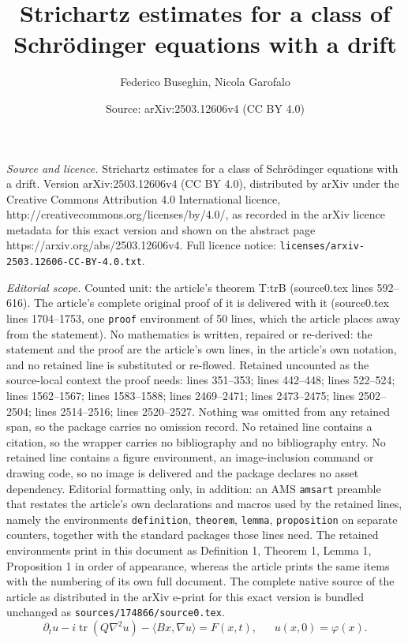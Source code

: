 \documentclass[10pt,a4paper]{amsart}
\title{Strichartz estimates for a class of Schr\"odinger equations with a drift}
\author{Federico Buseghin, Nicola Garofalo}
\date{Source: arXiv:2503.12606v4 (CC BY 4.0)}
\newcommand{\da}{\rangle}
\newcommand{\p}{\partial}
\newcommand{\sa}{\langle}
\newcommand{\tr}{\operatorname{tr}}
\def \vf{\varphi}
\begin{document}
\maketitle

\noindent\emph{Source and licence.} Strichartz estimates for a class of Schr\"odinger equations with a drift. Version arXiv:2503.12606v4 (CC BY 4.0), distributed by arXiv under the Creative Commons Attribution 4.0 International licence, http://creativecommons.org/licenses/by/4.0/, as recorded in the arXiv licence metadata for this exact version and shown on the abstract page https://arxiv.org/abs/2503.12606v4. Full licence notice: \texttt{licenses/arxiv-2503.12606-CC-BY-4.0.txt}.\par\smallskip

\noindent\textit{Editorial scope.} Counted unit: the article's theorem T:trB (source0.tex lines 592--616). The article's complete original proof of it is delivered with it (source0.tex lines 1704--1753, one \texttt{proof} environment of 50 lines, which the article places away from the statement). No mathematics is written, repaired or re-derived: the statement and the proof are the article's own lines, in the article's own notation, and no retained line is substituted or re-flowed.  Retained uncounted as the source-local context the proof needs: lines 351--353; lines 442--448; lines 522--524; lines 1562--1567; lines 1583--1588; lines 2469--2471; lines 2473--2475; lines 2502--2504; lines 2514--2516; lines 2520--2527.  Nothing was omitted from any retained span, so the package carries no omission record.  No retained line contains a citation, so the wrapper carries no bibliography and no bibliography entry.  No retained line contains a figure environment, an image-inclusion command or drawing code, so no image is delivered and the package declares no asset dependency.  Editorial formatting only, in addition: an AMS \texttt{amsart} preamble that restates the article's own declarations and macros used by the retained lines, namely the environments \texttt{definition}, \texttt{theorem}, \texttt{lemma}, \texttt{proposition} on separate counters, together with the standard packages those lines need.  The retained environments print in this document as Definition 1, Theorem 1, Lemma 1, Proposition 1 in order of appearance, whereas the article prints the same items with the numbering of its own full document.  The complete native source of the article as distributed in the arXiv e-print for this exact version is bundled unchanged as \texttt{sources/174866/source0.tex}.
\begin{equation}\label{A}
\p_t u - i \tr(Q\nabla^2 u) -  \sa Bx,\nabla u\da   = F(x,t),\ \ \ \ \ \ \ u(x,0) = \vf(x).
\end{equation}
\end{document}
